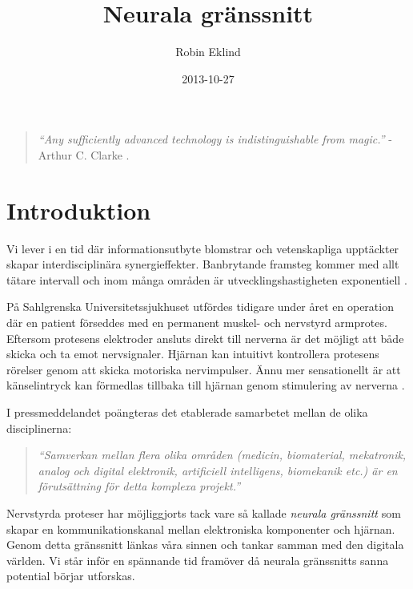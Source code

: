 \documentclass[12pt, a4paper]{article}
\title{Neurala gränssnitt}
\author{Robin Eklind}
\date{2013-10-27}
\begin{document}
\maketitle

\vfill

\begin{quote}
	\textit{``Any sufficiently advanced technology is indistinguishable from
	magic.''} - \\ Arthur C. Clarke \cite{clarke_quote}.
\end{quote}

\pagebreak

\tableofcontents

\pagebreak


\section{Introduktion}

Vi lever i en tid där informationsutbyte blomstrar och vetenskapliga upptäckter
skapar interdisciplinära synergieffekter. Banbrytande framsteg kommer med allt
tätare intervall och inom många områden är utvecklingshastigheten exponentiell
\cite{exponential}.

På Sahlgrenska Universitetssjukhuset utfördes tidigare under året en operation
där en patient förseddes med en permanent muskel- och nervstyrd armprotes.
Eftersom protesens elektroder ansluts direkt till nerverna är det möjligt att
både skicka och ta emot nervsignaler. Hjärnan kan intuitivt kontrollera
protesens rörelser genom att skicka motoriska nervimpulser. Ännu mer
sensationellt är att känselintryck kan förmedlas tillbaka till hjärnan genom
stimulering av nerverna \cite{prosthetic_operation}.

I pressmeddelandet poängteras det etablerade samarbetet mellan de olika
disciplinerna:
\begin{quote}
	\textit{``Samverkan mellan flera olika områden (medicin, biomaterial,
	mekatronik, analog och digital elektronik, artificiell intelligens,
	biomekanik etc.) är en förutsättning för detta komplexa projekt.''}
	\cite{prosthetic_operation}
\end{quote}

Nervstyrda proteser har möjliggjorts tack vare så kallade \textit{neurala
gränssnitt} som skapar en kommunikationskanal mellan elektroniska komponenter
och hjärnan. Genom detta gränssnitt länkas våra sinnen och tankar samman med den
digitala världen. Vi står inför en spännande tid framöver då neurala gränssnitts
sanna potential börjar utforskas.
\end{document}

